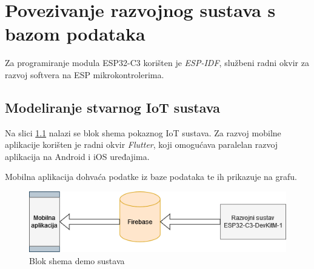 \chapter{Povezivanje razvojnog sustava s bazom podataka}

Za programiranje modula ESP32-C3 korišten je \textit{ESP-IDF}, službeni radni okvir za razvoj softvera na ESP mikrokontrolerima.

\cite{firebase_esp32}

\section{Modeliranje stvarnog IoT sustava}

Na slici \ref{fig:stvarni_slucaj} nalazi se blok shema pokaznog IoT sustava. Za razvoj mobilne aplikacije korišten je radni okvir \textit{Flutter}, koji omogućava paralelan razvoj aplikacija na Android i iOS uređajima. 

Mobilna aplikacija dohvaća podatke iz baze podataka te ih prikazuje na grafu. 

\begin{figure}[ht]
	\centering
	\includegraphics[scale=0.6]{imgs/stvarni_slucaj}
	\caption{Blok shema demo sustava}
	\label{fig:stvarni_slucaj}
\end{figure}

\eject
